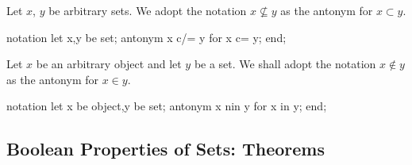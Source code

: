 \begin{paracol}{2}
\switchcolumn*\ensurevspace{5cm}
Let $x$, $y$ be arbitrary sets.
We adopt the notation $x\nsubseteq y$ as the antonym for $x\subset y$.
\switchcolumn
\begin{mizar}
notation
  let x,y be set;
  antonym x c/= y for x c= y;
end;
\end{mizar}

\switchcolumn*\ensurevspace{5cm}
Let $x$ be an arbitrary object and let $y$ be a set.
We shall adopt the notation $x\notin y$ as the antonym for $x\in y$.
\switchcolumn
\begin{mizar}
notation
  let x be object,y be set;
  antonym x nin y for x in y;
end;
\end{mizar}

\end{paracol}


\subsection{Boolean Properties of Sets: Theorems}
\bigskip

\begin{paracol}{2}
\end{paracol}